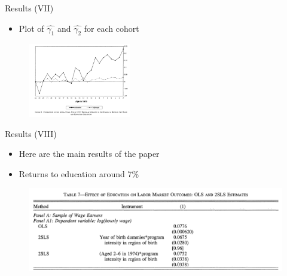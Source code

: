 \documentclass[11pt,notes=hide,aspectratio=169,mathserif]{beamer}
\begin{document}
\begin{frame}{Results (VII)}
\begin{itemize}
\item Plot of $\hat{\gamma_1}$ and $\hat{\gamma_2}$ for each cohort
\end{itemize}
\begin{figure}
    \centering
    \includegraphics[width=0.4\textwidth]{inputs/Figure3.png}
\end{figure}
\end{frame}


\begin{frame}{Results (VIII)}
\begin{itemize}
\item Here are the main results of the paper
\item Returns to education around 7\%
\end{itemize}
\begin{figure}
    \centering
    \includegraphics[width=\textwidth]{inputs/Table7.png}
\end{figure}
\end{frame}
\end{document}
